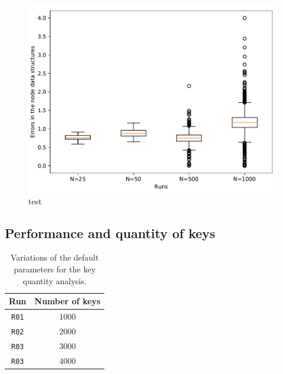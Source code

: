 \documentclass[11pt,twocolumn,letterpaper]{article}
\begin{document}
		\begin{figure}[!h]
		\centering
		\includegraphics[width=\linewidth,clip,trim=0 0.5cm 0 0.35cm]{figures/analysis2/errors_box.pdf}
		\caption{test}
		\label{fig:netsize2}
	\end{figure}
	
	\subsection{Performance and quantity of keys}
	\label{subsec:keyno_analysis}

	\begin{table}[!h]
		\caption{Variations of the default parameters for the key quantity analysis.}
		\label{tab:keyno_runs}
		\centering
		\begin{tabular}{cc}
			\hline
			\textbf{Run} & \textbf{Number of keys}\\
			\hline
			\texttt{R01} & $1000$\\
			\hline
			\texttt{R02} & $2000$\\
			\hline
			\texttt{R03} & $3000$\\
			\hline
			\texttt{R03} & $4000$\\
			\hline
		\end{tabular}
	\end{table}		

	\printbibliography
\end{document}
